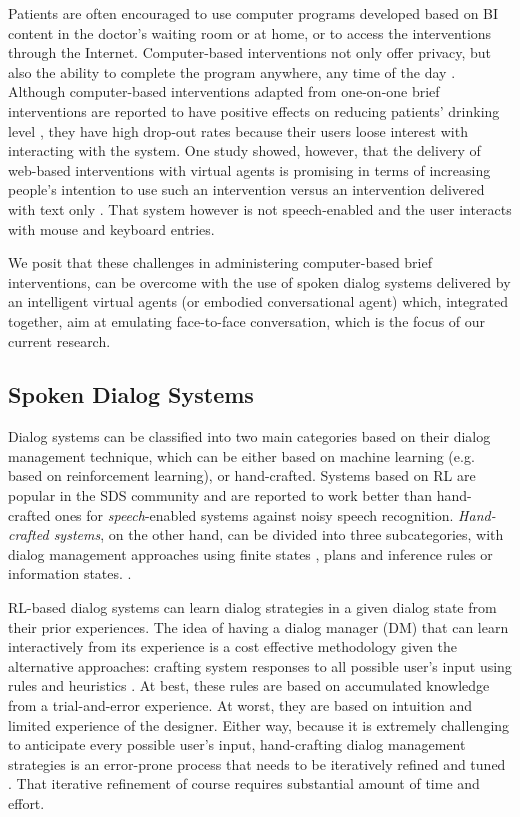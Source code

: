 \begin{sloppy}
Patients are often encouraged to use computer programs developed based on BI content in the doctor's waiting room or at home, or to access the interventions through the Internet.  Computer-based interventions not only offer privacy, but also the ability to complete the program anywhere, any time of the day 
\cite{OnlineAlcoholInterventionRev2011,OnlineAlcoholInterventionRev2010,Portnoy2008}. Although computer-based interventions adapted from one-on-one brief interventions are reported to have positive effects on reducing patients' drinking level \cite{OnlineAlcoholInterventionRev2011,OnlineAlcoholInterventionRev2010,Hester2005}, they have high drop-out rates because their users loose interest with interacting with the system.  One study showed, however, that the delivery of web-based interventions with virtual agents is promising in terms of increasing people's intention to use such an intervention versus an intervention delivered with text only \cite{lisetti2013}.  That system however is not speech-enabled and the user interacts with mouse and keyboard entries. 

We posit that these challenges in administering computer-based brief interventions, can be overcome with the use of spoken dialog systems delivered by an intelligent virtual agents (or embodied conversational agent) which, integrated together, aim at emulating face-to-face conversation, which is the focus of our current research.

\subsection{Spoken Dialog Systems}

Dialog systems can be classified into two main categories based on their dialog management technique, which can be either based on machine learning (e.g. based on reinforcement learning), or hand-crafted.  Systems based on RL are popular in the SDS community and are reported to work better than hand-crafted ones for {\em speech}-enabled systems \cite{young2013pomdp,frampton2009} against noisy speech recognition. {\em Hand-crafted systems}, on the other hand, can be divided into three subcategories, with dialog management approaches using finite states \cite{sutton1998CSLU}, plans and inference rules \cite{ferguson1998trips,Bohus2009} or information states. \cite{Traum03}.

RL-based dialog systems can learn dialog strategies in a given dialog state from their prior experiences. The idea of having a dialog manager (DM) that can learn interactively from its experience is a cost effective methodology given the alternative approaches: crafting system responses to all possible user's input using rules and heuristics \cite{paek2008automating}. At best, these rules are based on accumulated knowledge from a trial-and-error experience. At worst, they are based on intuition and limited experience of the designer.  Either way, because it is extremely challenging to anticipate every possible user's input, hand-crafting dialog management strategies is an error-prone process that needs to be iteratively refined and tuned \cite{paek2008automating}.  That iterative refinement of course requires substantial amount of time and effort. 


\end{sloppy}
